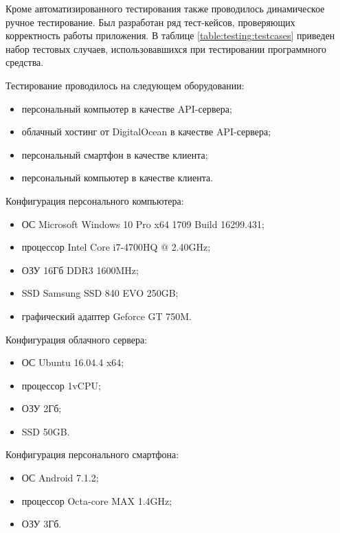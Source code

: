 Кроме  автоматизированного  тестирования  также  проводилось динамическое ручное тестирование. Был  разработан  ряд  тест-кейсов, проверяющих корректность работы приложения. В таблице \ref{table:testing:testcases}  приведен набор тестовых случаев, использовавшихся при тестировании программного средства.

Тестирование проводилось на следующем оборудовании:

\begin{itemize}
	\item персональный компьютер в качестве API-сервера;
	\item облачный хостинг от DigitalOcean в качестве API-сервера;
	\item персональный смартфон в качестве клиента;
	\item персональный компьютер в качестве клиента.
\end{itemize}

Конфигурация персонального компьютера:

\begin{itemize}
	\item ОС Microsoft Windows 10 Pro x64 1709 Build 16299.431;
	\item процессор Intel Core i7-4700HQ @ 2.40GHz;
	\item ОЗУ 16Гб DDR3 1600MHz;
	\item SSD Samsung SSD 840 EVO 250GB;
	\item графический адаптер Geforce GT 750M.
\end{itemize}

Конфигурация облачного сервера:

\begin{itemize}
	\item ОС Ubuntu 16.04.4 x64;
	\item процессор 1vCPU;
	\item ОЗУ 2Гб;
	\item SSD 50GB.
\end{itemize}

Конфигурация персонального смартфона:

\begin{itemize}
	\item ОС Android 7.1.2;
	\item процессор Octa-core MAX 1.4GHz;
	\item ОЗУ 3Гб.
\end{itemize}

